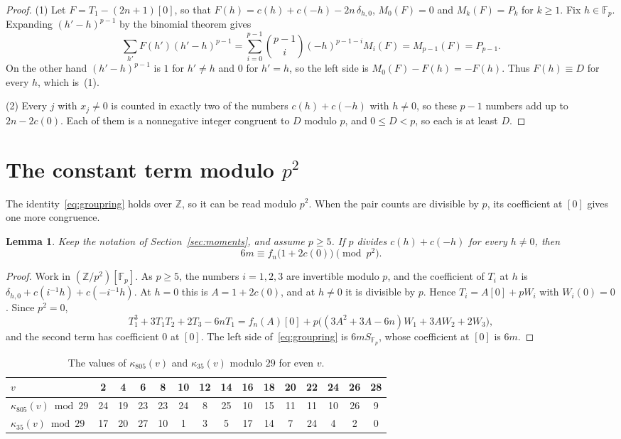 \documentclass{amsart}
\newtheorem{lemma}[theorem]{Lemma}
\theoremstyle{definition}
\theoremstyle{remark}
\numberwithin{equation}{section}
\newcommand{\Z}{\mathbb{Z}}
\newcommand{\F}{\mathbb{F}}
\newcommand{\gp}[1]{[#1]}
\begin{document}
\begin{proof}
(1) Let $F=T_1-(2n+1)\gp0$, so that $F(h)=c(h)+c(-h)-2n\,\delta_{h,0}$, $M_0(F)=0$ and $M_k(F)=P_k$ for $k\ge1$. Fix $h\in\F_p$. Expanding $(h'-h)^{p-1}$ by the binomial theorem gives
\[
\sum_{h'}F(h')(h'-h)^{p-1}=\sum_{i=0}^{p-1}\binom{p-1}{i}(-h)^{p-1-i}M_i(F)=M_{p-1}(F)=P_{p-1}.
\]
On the other hand $(h'-h)^{p-1}$ is $1$ for $h'\ne h$ and $0$ for $h'=h$, so the left side is $M_0(F)-F(h)=-F(h)$. Thus $F(h)\equiv D$ for every $h$, which is~(1).

(2) Every $j$ with $x_j\ne0$ is counted in exactly two of the numbers $c(h)+c(-h)$ with $h\ne0$, so these $p-1$ numbers add up to $2n-2c(0)$. Each of them is a nonnegative integer congruent to $D$ modulo $p$, and $0\le D<p$, so each is at least $D$.
\end{proof}

\section{The constant term modulo \texorpdfstring{$p^2$}{p squared}}\label{sec:p2}

The identity~\eqref{eq:groupring} holds over $\Z$, so it can be read modulo $p^2$. When the pair counts are divisible by $p$, its coefficient at $\gp0$ gives one more congruence.

\begin{lemma}\label{lem:p2}
Keep the notation of Section~\ref{sec:moments}, and assume $p\ge5$. If $p$ divides $c(h)+c(-h)$ for every $h\ne0$, then
\[
6m\equiv f_n\bigl(1+2c(0)\bigr)\pmod{p^2}.
\]
\end{lemma}

\begin{proof}
Work in $(\Z/p^2)[\F_p]$. As $p\ge5$, the numbers $i=1,2,3$ are invertible modulo $p$, and the coefficient of $T_i$ at $h$ is $\delta_{h,0}+c(i^{-1}h)+c(-i^{-1}h)$. At $h=0$ this is $A=1+2c(0)$, and at $h\ne0$ it is divisible by $p$. Hence $T_i=A\gp0+pW_i$ with $W_i(0)=0$. Since $p^2=0$,
\[
T_1^3+3T_1T_2+2T_3-6nT_1=f_n(A)\gp0+p\bigl((3A^2+3A-6n)W_1+3AW_2+2W_3\bigr),
\]
and the second term has coefficient $0$ at $\gp0$. The left side of~\eqref{eq:groupring} is $6mS_{\F_p}$, whose coefficient at $\gp0$ is $6m$.
\end{proof}

\begin{table}[ht]
\centering
\caption{The values of $\kappa_{805}(v)$ and $\kappa_{35}(v)$ modulo $29$ for even $v$.}
\label{tab:kappa}
\small
\setlength{\tabcolsep}{4.2pt}
\begin{tabular}{l|cccccccccccccc}
$v$ & 2 & 4 & 6 & 8 & 10 & 12 & 14 & 16 & 18 & 20 & 22 & 24 & 26 & 28\\
\hline
$\kappa_{805}(v)\bmod 29$ & 24 & 19 & 23 & 23 & 24 & 8 & 25 & 10 & 15 & 11 & 11 & 10 & 26 & 9\\
$\kappa_{35}(v)\bmod 29$ & 17 & 20 & 27 & 10 & 1 & 3 & 5 & 17 & 14 & 7 & 24 & 4 & 2 & 0
\end{tabular}
\end{table}
\end{document}

